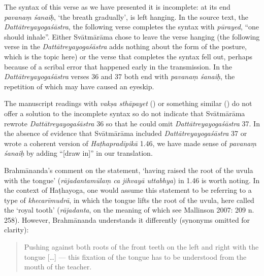 \begin{ekdosis}
\begin{philcomm}[hp01_045]

The syntax of this verse as we have presented it is incomplete: at its end \emph{pavanaṃ śanaiḥ}, `the breath gradually', is left hanging. In the source text, the \emph{Dattātreyayogaśāstra}, the following verse completes the syntax with \emph{pūrayed}, “one should inhale”. Either Svātmārāma chose to leave the verse hanging (the following verse in the \emph{Dattātreyayogaśāstra} adds nothing about the form of the posture, which is the topic here) or the verse that completes the syntax fell out, perhaps because of a scribal error that happened early in the transmission. In the \emph{Dattātreyayogaśāstra} verses 36 and 37 both end with \emph{pavanaṃ śanaiḥ}, the repetition of which may have caused an eyeskip.

The manuscript readings with \emph{vakṣa sthāpayet} () or something similar () do not offer a solution to the incomplete syntax so do not indicate that Svātmārāma rewrote \emph{Dattātreyayogaśāstra} 36 so that he could omit \emph{Dattātreyayogaśāstra} 37. In the absence of evidence that Svātmārāma included \emph{Dattātreyayogaśāstra} 37 or wrote a coherent version of \emph{Haṭhapradīpikā} 1.46, we have made sense of \emph{pavanaṃ śanaiḥ} by adding “[draw in]” in our translation. 

Brahmānanda's comment on the statement, `having raised the root of the uvula with the tongue' (\emph{rājadantamūlaṃ ca jihvayā uttabhya}) in 1.46 is worth noting. In the context of Haṭhayoga, one would assume this statement to be referring to a type of  \emph{khecarīmudrā}, in which the tongue lifts the root of the uvula, here called the `royal tooth' (\emph{rājadanta}, on the meaning of which see Mallinson 2007: 209 n. 258). However, Brahmānanda understands it differently (synonyms omitted for clarity): 
\begin{quote}
Pushing against both roots of the front teeth on the left and right with the tongue [\ldots] — this fixation of the tongue has to be understood from the mouth of the teacher.


\end{quote}
\end{philcomm}
\end{ekdosis}
